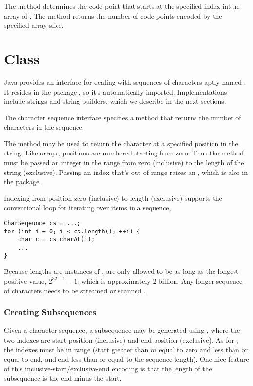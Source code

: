 The method  determines the code point
that starts at the specified index int he array of .  The
method  returns the number of
code points encoded by the specified  array slice.


\section{ Class}

Java provides an interface for dealing with sequences of characters
aptly named .  It resides in the package
, so it's automatically imported.  Implementations
include strings and string builders, which we describe in the next
sections.

The character sequence interface specifies a method 
that returns the number of characters in the sequence.  

The method  may be used to return the character at a
specified position in the string.  Like arrays, positions are numbered
starting from zero.  Thus the method must be passed an integer in the
range from zero (inclusive) to the length of the string (exclusive).
Passing an index that's out of range raises an
, which is also in the
 package.

Indexing from position zero (inclusive) to length (exclusive) supports
the conventional  loop for iterating over items in a sequence,
%
\begin{verbatim}
CharSeqeunce cs = ...;
for (int i = 0; i < cs.length(); ++i) {
    char c = cs.charAt(i);
    ...
}
\end{verbatim}
%
Because lengths are instances of , are only allowed to be as
long as the longest positive  value, $2^{32-1} - 1$, which
is approximately 2 billion.  Any longer sequence of characters needs
to be streamed  or scanned
.

\subsubsection{Creating Subsequences}

Given a character sequence, a subsequence may be generated using
, where the two indexes are start position
(inclusive) and end position (exclusive).  As for , the
indexes must be in range (start greater than or equal to zero and less
than or equal to end, and end less than or equal to the sequence
length). One nice feature of this inclusive-start/exclusive-end
encoding is that the length of the subsequence is the end minus the
start.  

